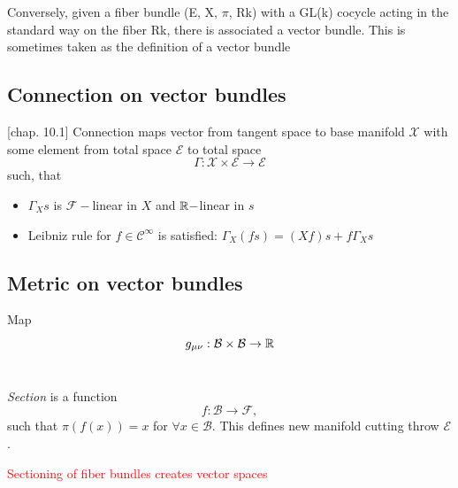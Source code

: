 \section{}
Conversely, given a fiber bundle (E, X, $\pi$, Rk) with a GL(k) cocycle acting in the standard way on the fiber Rk, there is associated a vector bundle. This is sometimes taken as the definition of a vector bundle


\subsection{Connection on vector bundles}
\citep{lu}[chap. 10.1]
Connection maps vector from tangent space to base manifold $\mathcal{X}$ with some element from total space $\mathcal{E}$ to total space
$$\Gamma: \mathcal{X}\times \mathcal{E}\rightarrow \mathcal{E}$$
such, that
\begin{itemize}
    \item $\Gamma_X s$ is $\mathcal{F}-$linear in $X$ and $\mathbb{R}-$linear in $s$
    \item Leibniz rule for $f\in \mathcal{C}^\infty$ is satisfied: $\Gamma_X(f s) = (X f)s+f\Gamma_X s$
\end{itemize}


\subsection{Metric on vector bundles}
Map
$$g_{\mu\nu}: \mathcal{B}\times \mathcal{B} \rightarrow \mathbb{R}$$

\section{}
\label{sec:section}
\emph{Section} is a function
$$f:\mathcal{B}\rightarrow \mathcal{F},$$
such that $\pi(f(x))=x$ for $\forall x\in \mathcal{B}$. This defines new manifold cutting throw $\mathcal{E}$.

\textcolor{red}{Sectioning of fiber bundles creates vector spaces}


